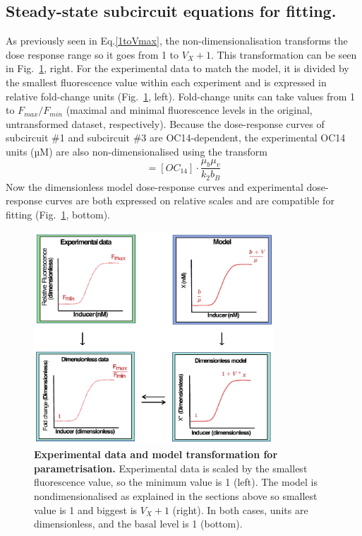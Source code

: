 \subsection{Steady-state subcircuit equations for fitting.}
As previously seen in Eq.\ref{1toVmax},
the non-dimensionalisation transforms the dose response range so it goes from 1 to $V_{X}+1$.
This transformation can be seen in Fig.~\ref{fig:dose_response_transforms}, right.
For the experimental data to match the model,
it is divided by the smallest fluorescence value within each experiment and is expressed in relative fold-change units
(Fig.~\ref{fig:dose_response_transforms}, left).
Fold-change units can take values from 1 to $F_{max}/F_{min}$
(maximal and minimal fluorescence levels in the original, untransformed dataset, respectively).
Because the dose-response curves of subcircuit \#1 and subcircuit \#3 are OC14-dependent, the experimental OC14 units (µM) are also non-dimensionalised using the transform
\begin{equation}
    [B*]=[OC_{14}] \cdot \frac{\mu_{b}\mu_{v}}{k_{2}b_{B}}
    \label{Btransform}
\end{equation}
Now the dimensionless model dose-response curves and experimental dose-response curves are both expressed on relative scales and are compatible for fitting (Fig.~\ref{fig:dose_response_transforms}, bottom).
\begin{figure}[H] %
    \centering
    \begin{adjustbox}{center}
        \includegraphics[width=0.8\textwidth]{chapters/Chapter 2/dose_response_transforms}
    \end{adjustbox}
    \caption{\textbf{Experimental data and model transformation for parametrisation.} Experimental data is scaled by the smallest fluorescence value, so the minimum value is 1 (left). The model is nondimensionalised
    as explained in the sections above so smallest value is 1
    and biggest is $V_{X} +1$ (right).
    In both cases, units are dimensionless, and the basal level is 1 (bottom).}
    \label{fig:dose_response_transforms}
\end{figure}


